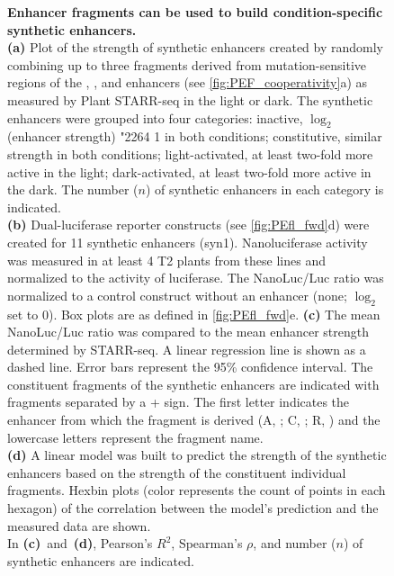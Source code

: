 \documentclass[10pt]{article}
\newcommand{\fignormal}{\footnotesize}
\renewcommand{\textle}{\char"2264{}}
\newcommand{\light}{light}
\newcommand{\dark}{dark}
\newif\ifnpc
\newcounter{fig}
\newenvironment{fig}{%
	\begin{figure}[p]%
		\stepcounter{fig}%
		\pdfbookmark{\figurename\ \thefig}{figure\thefig}
		\tikzsetnextfilename{figure\thefig}%
		\fignormal%
		\centering%
}{%
	\end{figure}%
	\clearpage%
	\ifnpc%
		\makenextpagecaption%
		\global\npcfalse%
	\fi%
}
\newif\ifsupp
\newcommand{\titleend}{\\}
\newcommand{\nextentry}{\\}
\newcommand{\captiontitle}[2][]{\textbf{#2.}\titleend}
\newif\ifsubfigupper
\newcounter{subfig}[figure]
\newcommand{\subfigrefsep}{}
\newcommand{\subfigrefand}{~and~}
\newcommand{\subfigunformatted}[1]{\ifsubfigupper\uppercase{#1}\else\lowercase{#1}\fi}
\newcommand{\plainsubfigref}[1]{\textbf{\subfigunformatted{#1}}}
\newcommand{\subfig}[1]{\textbf{(\plainsubfigref{#1})}\subfigrefsep}
\newcommand{\parensubfig}[2][]{\textbf{(#1\plainsubfigref{#2})}}
\begin{document}
		\begin{fig}
			\caption{%
				\captiontitle{Enhancer fragments can be used to build condition-specific synthetic enhancers}%
				\subfig{A} Plot of the strength of synthetic enhancers created by randomly combining up to three fragments derived from mutation-sensitive regions of the , , and  enhancers (see \cref{fig:PEF_cooperativity}\subfigunformatted{A}) as measured by Plant STARR-seq in the \light{} or \dark. The synthetic enhancers were grouped into four categories: inactive, $\log_2$(enhancer strength) \textle{} 1 in both conditions; constitutive, similar strength in both conditions;  light-activated, at least two-fold more active in the light; dark-activated, at least two-fold more active in the dark. The number ($n$) of synthetic enhancers in each category is indicated.\nextentry
				\subfig{B} Dual-luciferase reporter constructs (see \cref{fig:PEfl_fwd}\subfigunformatted{D}) were created for 11 synthetic enhancers (syn1). Nanoluciferase activity was measured in at least 4 T2 plants from these lines and normalized to the activity of luciferase. The NanoLuc/Luc ratio was normalized to a control construct without an enhancer (none; $\log_2$ set to 0). Box plots are as defined in \cref{fig:PEfl_fwd}\subfigunformatted{E}.
				\subfig{C} The mean NanoLuc/Luc ratio was compared to the mean enhancer strength determined by STARR-seq. A linear regression line is shown as a dashed line. Error bars represent the 95\% confidence interval. The constituent fragments of the synthetic enhancers are indicated with fragments separated by a + sign. The first letter indicates the  enhancer from which the fragment is derived (A, ; C, ; R, ) and the lowercase letters represent the fragment name.\nextentry
				\subfig{D} A linear model was built to predict the strength of the synthetic enhancers based on the strength of the constituent individual fragments. Hexbin plots (color represents the count of points in each hexagon) of the correlation between the model's prediction and the measured data are shown.\nextentry
				In \parensubfig{C}\subfigrefand\parensubfig{D}, Pearson's $R^2$, Spearman's $\rho$, and number ($n$) of synthetic enhancers are indicated.
			}%
			\label{fig:PEF_model}
		\end{fig}

	
	\fi
	
	\ifsupp
		
\end{document}
